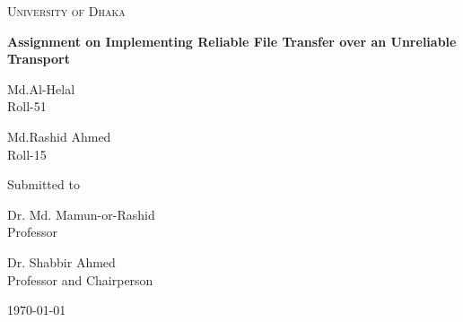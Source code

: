 \documentclass[12pt,a4paper]{report}
\begin{document}
\begin{titlepage}
\centering
{\scshape\LARGE University of Dhaka \par}
\vspace{1.5cm}
{\huge\bfseries Assignment on Implementing Reliable File Transfer over an Unreliable Transport\par}
\vspace{3cm}
{\Large \parbox{5cm}{\centering Md.Al-Helal\\Roll-51}\hspace{1cm}\parbox{6cm}{\centering Md.Rashid Ahmed\\Roll-15}}
\vfill
Submitted to\\
\vspace{0.8cm}
\parbox{6cm}{\centering Dr. Md. Mamun-or-Rashid \\ Professor}\hspace{1cm}\parbox{5cm}{\centering Dr. Shabbir Ahmed \\Professor and Chairperson}
\vfill
{\large \today\par}
\end{titlepage}
\end{document}
